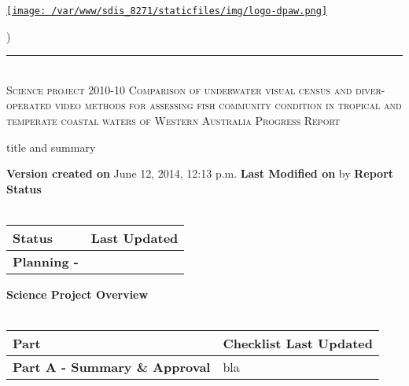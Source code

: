 \documentclass[version=last, paper=a4, DIV=18, usenames, dvipsnames]{scrartcl}
\newcommand{\HRule}{\rule{\linewidth}{0.1pt}}
\begin{document}
\setcounter{secnumdepth}{-1}


\begin{titlepage}
\begin{center}
\begin{minipage}[t]{0.28\textwidth}
\begin{flushleft}
\href{http://www.dpaw.wa.gov.au}{\texttt{[image: /var/www/sdis\_8271/staticfiles/img/logo-dpaw.png]}}
\end{flushleft}
\end{minipage}
\begin{minipage}[b]{0.7\textwidth}
\begin{flushright}
    \href{http://sdis.dpaw.wa.gov.au/documents/progressreport/1180/download/}{}) \\
\end{flushright}
\end{minipage}
\HRule \\[0.4cm]
\vfill
\textsc{\Huge Science project 2010-10 Comparison of underwater visual census and diver-operated video methods for assessing fish community condition in tropical and temperate coastal waters of Western Australia \newline }
\vfill
\textsc{\Huge Progress Report}

\vfill\vfill\vfill\vfill
title and summary

\vfill\vfill\vfill\vfill\vfill\vfill\vfill\vfill

\textbf{Version created on} June 12, 2014, 12:13 p.m.
\vfill
\textbf{Last Modified on}  by 
\vfill\vfill
\textbf{Report Status}\\\,
\begin{tabu} to \linewidth { | X[l] | X | }
\hline
{}
Status & Last Updated \\
\hline
\textbf{Planning - } \\
\hline
\end{tabu}
\vfill
\textbf{Science Project Overview}\\\,
\begin{tabu} to \linewidth { | X[l] | X | }
\hline
{}
Part & Checklist Last Updated \\
\hline
\textbf{Part A - Summary \& Approval} & bla \\
\hline
\end{tabu}

\end{center}
\end{titlepage}
\end{document}
